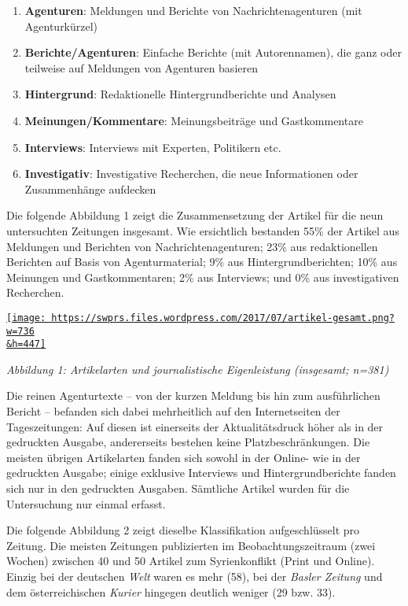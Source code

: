 \begin{enumerate}
\def\labelenumi{\arabic{enumi}.}
\tightlist
\item
  \textbf{Agenturen}: Meldungen und Berichte von Nachrichtenagenturen
  (mit Agenturkürzel)
\item
  \textbf{Berichte/Agenturen}: Einfache Berichte (mit Autorennamen), die
  ganz oder teilweise auf Meldungen von Agenturen basieren
\item
  \textbf{Hintergrund}: Redaktionelle Hintergrundberichte und Analysen
\item
  \textbf{Meinungen/Kommentare}: Meinungsbeiträge und Gastkommentare
\item
  \textbf{Interviews}: Interviews mit Experten, Politikern etc.
\item
  \textbf{Investigativ}: Investigative Recherchen, die neue
  Informationen oder Zusammenhänge aufdecken
\end{enumerate}

Die folgende Abbildung 1 zeigt die Zusammensetzung der Artikel für die
neun untersuchten Zeitungen insgesamt. Wie ersichtlich bestanden 55\%
der Artikel aus Meldungen und Berichten von Nachrichtenagenturen; 23\%
aus redaktionellen Berichten auf Basis von Agenturmaterial; 9\% aus
Hintergrundberichten; 10\% aus Meinungen und Gastkommentaren; 2\% aus
Interviews; und 0\% aus investigativen Recherchen.

\href{https://swprs.files.wordpress.com/2017/07/artikel-gesamt.png}{\texttt{[image: https://swprs.files.wordpress.com/2017/07/artikel-gesamt.png?w=736\\\&h=447]}}

\emph{Abbildung 1: Artikelarten und journalistische Eigenleistung
(insgesamt; n=381)}

Die reinen Agenturtexte -- von der kurzen Meldung bis hin zum
ausführlichen Bericht -- befanden sich dabei mehrheitlich auf den
Internet­seiten der Tageszeitungen: Auf diesen ist einerseits der
Aktualitätsdruck höher als in der gedruckten Ausgabe, andererseits
bestehen keine Platzbeschränkungen. Die meisten übrigen Artikelarten
fanden sich sowohl in der Online- wie in der gedruckten Ausgabe; einige
exklusive Interviews und Hintergrundberichte fanden sich nur in den
gedruckten Ausgaben. Sämtliche Artikel wurden für die Untersuchung nur
einmal erfasst.

Die folgende Abbildung 2 zeigt dieselbe Klassifikation aufgeschlüsselt
pro Zeitung. Die meisten Zeitungen publizierten im Beobachtungszeitraum
(zwei Wochen) zwischen 40 und 50 Artikel zum Syrienkonflikt (Print und
Online). Einzig bei der deutschen \emph{Welt} waren es mehr (58), bei
der \emph{Basler Zeitung} und dem österreichischen \emph{Kurier}
hingegen deutlich weniger (29 bzw. 33).


